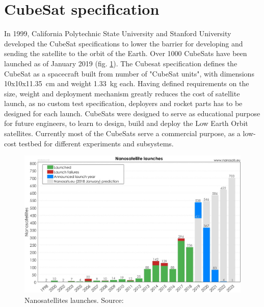 \section{CubeSat specification}
In 1999, California Polytechnic State University and Stanford University developed the CubeSat specifications to lower the barrier for developing and sending the satellite to the orbit of the Earth. Over 1000 CubeSats have been launched as of January 2019 (fig. \ref{nanosatellites_launched_by_years}). The Cubesat specification \cite{cubesat_spec} defines the CubeSat as a spacecraft built from number of "CubeSat units", with dimensions \si{10}x\si{10}x\SI{11.35}{\cm} and weight \SI{1.33}{\kilo\gram} each. Having defined requirements on the size, weight and deployment mechanism greatly reduces the cost of satellite launch, as no custom test specification, deployers and rocket parts has to be designed for each launch. CubeSats were designed to serve as educational purpose for future engineers, to learn to design, build and deploy the Low Earth Orbit satellites. Currently most of the CubeSats serve a commercial purpose, as a low-cost testbed for different experiments and subsystems.

\begin{figure}[h]
    \centering
    \includegraphics[width=0.65\paperwidth]{img/3/nanosatellites_launched_by_years.jpg}
    \caption{Nanosatellites launches. Source: \cite{nanosatellites_launched_by_years}}
    \label{nanosatellites_launched_by_years}
\end{figure}

\newpage


